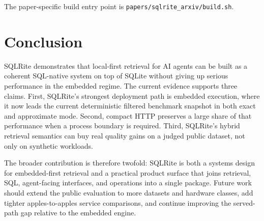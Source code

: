 \documentclass[11pt]{article}
\begin{document}
The paper-specific build entry point is \texttt{papers/sqlrite\_arxiv/build.sh}.

\section{Conclusion}
SQLRite demonstrates that local-first retrieval for AI agents can be built as a coherent SQL-native system on top of SQLite without giving up serious performance in the embedded regime. The current evidence supports three claims. First, SQLRite's strongest deployment path is embedded execution, where it now leads the current deterministic filtered benchmark snapshot in both exact and approximate mode. Second, compact HTTP preserves a large share of that performance when a process boundary is required. Third, SQLRite's hybrid retrieval semantics can buy real quality gains on a judged public dataset, not only on synthetic workloads.

The broader contribution is therefore twofold: SQLRite is both a systems design for embedded-first retrieval and a practical product surface that joins retrieval, SQL, agent-facing interfaces, and operations into a single package. Future work should extend the public evaluation to more datasets and hardware classes, add tighter apples-to-apples service comparisons, and continue improving the served-path gap relative to the embedded engine.



\end{document}
